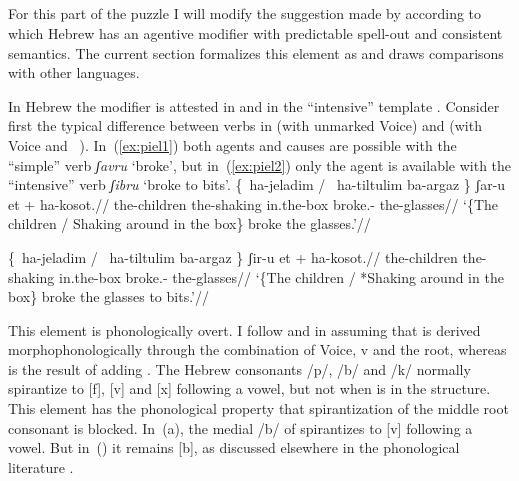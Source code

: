 	\subsection{\va} \label{voice:va:heb}

For this part of the puzzle I will modify the suggestion made by \cite{doron03} according to which Hebrew has an agentive modifier with predictable spell-out and consistent semantics. The current section formalizes this element as {\va} and draws comparisons with other languages.

In Hebrew the modifier {\va} is attested in {\thit} and in the ``intensive'' template {\tpie}. Consider first the typical difference between verbs in {\tkal} (with unmarked Voice) and {\tpie} (with Voice and \va~\!). In~(\ref{ex:piel1}) both agents and causes are possible with the ``simple'' {\tkal} verb \emph{ʃavru} `broke', but in~(\ref{ex:piel2}) only the agent is available with the ``intensive'' {\tpie} verb \emph{ʃibru} `broke to bits'.
\pex \citet[20]{doron03}
	\a \label{ex:piel1}\begingl
	\gla \{\cmark~ha-jeladim / \cmark~ha-tiltulim ba-argaz \} ʃar-u et + \phantom{\{\cmark~}ha-kosot.//
	\glb \phantom{\{\cmark~}the-children {} \phantom{\cmark~}the-shaking in.the-box {} broke.-  \phantom{\{\cmark~}the-glasses//
	\glft `\{The children / Shaking around in the box\} broke the glasses.'//
	\endgl

	\a \label{ex:piel2}\begingl
	\gla \{\cmark~ha-jeladim / \xmark~ha-tiltulim ba-argaz \} ʃir-u et + \phantom{\{\cmark~}ha-kosot.//
	\glb \phantom{\{\cmark~}the-children {} \phantom{\xmark~}the-shaking in.the-box {} broke.-  \phantom{\{\cmark~}the-glasses//
	\glft `\{The children / *Shaking around in the box\} broke the glasses to bits.'//
	\endgl
\xe

This element is phonologically overt. I follow \cite{doron03} and \cite{kastner16nllt} in assuming that {\tkal} is derived morphophonologically through the combination of Voice, v and the root, whereas {\tpie} is the result of adding {\va}. The Hebrew consonants /p/, /b/ and /k/ normally spirantize to [f], [v] and [x] following a vowel, but not when {\va} is in the structure. This element has the phonological property that spirantization of the middle root consonant is blocked. In~(\lastx a), the medial /b/ of  spirantizes to [v] following a vowel. But in~(\lastx) it remains [b], as discussed elsewhere in the phonological literature \citep{temkinmartinez08wccfl,gouskova12nllt,kastner16nllt}. 

